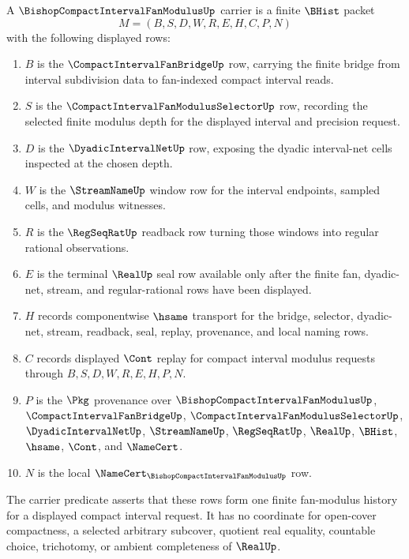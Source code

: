 \begin{definition}
\label{def:bishop-compact-interval-fan-modulus-carrier}
A $\BishopCompactIntervalFanModulusUp$ carrier is a finite $\BHist$ packet
$$
M=(B,S,D,W,R,E,H,C,P,N)
$$
with the following displayed rows:
\begin{enumerate}
\item $B$ is the $\CompactIntervalFanBridgeUp$ row, carrying the finite bridge from interval subdivision data to fan-indexed compact interval reads.
\item $S$ is the $\CompactIntervalFanModulusSelectorUp$ row, recording the selected finite modulus depth for the displayed interval and precision request.
\item $D$ is the $\DyadicIntervalNetUp$ row, exposing the dyadic interval-net cells inspected at the chosen depth.
\item $W$ is the $\StreamNameUp$ window row for the interval endpoints, sampled cells, and modulus witnesses.
\item $R$ is the $\RegSeqRatUp$ readback row turning those windows into regular rational observations.
\item $E$ is the terminal $\RealUp$ seal row available only after the finite fan, dyadic-net, stream, and regular-rational rows have been displayed.
\item $H$ records componentwise $\hsame$ transport for the bridge, selector, dyadic-net, stream, readback, seal, replay, provenance, and local naming rows.
\item $C$ records displayed $\Cont$ replay for compact interval modulus requests through $B,S,D,W,R,E,H,P,N$.
\item $P$ is the $\Pkg$ provenance over $\BishopCompactIntervalFanModulusUp$, $\CompactIntervalFanBridgeUp$, $\CompactIntervalFanModulusSelectorUp$, $\DyadicIntervalNetUp$, $\StreamNameUp$, $\RegSeqRatUp$, $\RealUp$, $\BHist$, $\hsame$, $\Cont$, and $\NameCert$.
\item $N$ is the local $\NameCert_{\BishopCompactIntervalFanModulusUp}$ row.
\end{enumerate}
The carrier predicate asserts that these rows form one finite fan-modulus history for a displayed compact interval request. It has no coordinate for open-cover compactness, a selected arbitrary subcover, quotient real equality, countable choice, trichotomy, or ambient completeness of $\RealUp$.
\end{definition}

